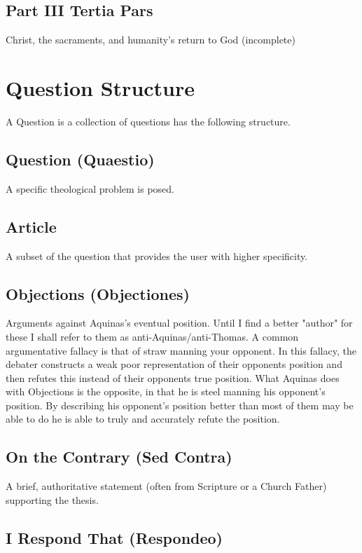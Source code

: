 \documentclass{ucetd}
\begin{document}
\subsection*{Part III Tertia Pars} Christ, the sacraments, and humanity's return to God (incomplete)

\clearpage
\section{Question Structure}

A Question is a collection of questions has the following structure.
\subsection*{Question (Quaestio)}

A specific theological problem is posed.
\subsection*{Article}

A subset of the question that provides the user with higher specificity.
\subsection*{Objections (Objectiones)}

Arguments against Aquinas's eventual position. Until I find a better "author" for these I shall refer to them as anti-Aquinas/anti-Thomas. A common argumentative fallacy is that of straw manning your opponent. In this fallacy, the debater constructs a weak poor representation of their opponents position and then refutes this instead of their opponents true position. What Aquinas does with Objections is the opposite, in that he is steel manning his opponent's position. By describing his opponent's position better than most of them may be able to do he is able to truly and accurately refute the position.
\subsection*{On the Contrary (Sed Contra)}

A brief, authoritative statement (often from Scripture or a Church Father) supporting the thesis.
\subsection*{I Respond That (Respondeo)}
\end{document}
